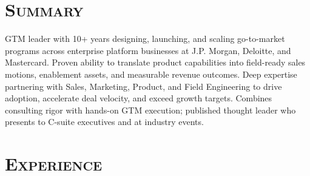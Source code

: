 \documentclass[11pt,a4paper]{moderncv}
\begin{document}
\makecvtitle
\vspace{-40pt}

\section{\textsc{Summary}}
\vspace{-7pt}
GTM leader with 10+ years designing, launching, and scaling go-to-market programs across enterprise platform businesses at J.P. Morgan, Deloitte, and Mastercard. Proven ability to translate product capabilities into field-ready sales motions, enablement assets, and measurable revenue outcomes. Deep expertise partnering with Sales, Marketing, Product, and Field Engineering to drive adoption, accelerate deal velocity, and exceed growth targets. Combines consulting rigor with hands-on GTM execution; published thought leader who presents to C-suite executives and at industry events.

\section{\textsc{Experience}}
\end{document}
